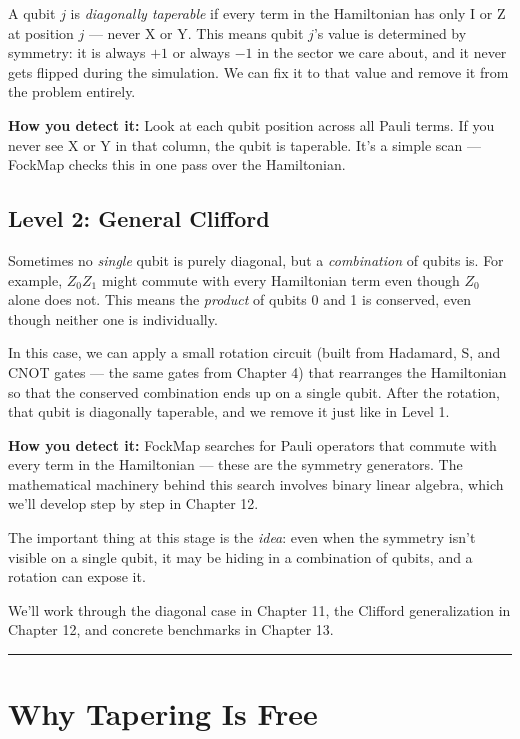\documentclass[
  11pt,
  oneside]{book}
\begin{document}
A qubit \(j\) is \emph{diagonally taperable} if every term in the
Hamiltonian has only I or Z at position \(j\) --- never X or Y. This
means qubit \(j\)'s value is determined by symmetry: it is always \(+1\)
or always \(-1\) in the sector we care about, and it never gets flipped
during the simulation. We can fix it to that value and remove it from
the problem entirely.

\textbf{How you detect it:} Look at each qubit position across all Pauli
terms. If you never see X or Y in that column, the qubit is taperable.
It's a simple scan --- FockMap checks this in one pass over the
Hamiltonian.

\subsection{Level 2: General Clifford}\label{level-2-general-clifford}

Sometimes no \emph{single} qubit is purely diagonal, but a
\emph{combination} of qubits is. For example, \(Z_0 Z_1\) might commute
with every Hamiltonian term even though \(Z_0\) alone does not. This
means the \emph{product} of qubits 0 and 1 is conserved, even though
neither one is individually.

In this case, we can apply a small rotation circuit (built from
Hadamard, S, and CNOT gates --- the same gates from Chapter 4) that
rearranges the Hamiltonian so that the conserved combination ends up on
a single qubit. After the rotation, that qubit is diagonally taperable,
and we remove it just like in Level 1.

\textbf{How you detect it:} FockMap searches for Pauli operators that
commute with every term in the Hamiltonian --- these are the symmetry
generators. The mathematical machinery behind this search involves
binary linear algebra, which we'll develop step by step in Chapter 12.

The important thing at this stage is the \emph{idea}: even when the
symmetry isn't visible on a single qubit, it may be hiding in a
combination of qubits, and a rotation can expose it.

We'll work through the diagonal case in Chapter 11, the Clifford
generalization in Chapter 12, and concrete benchmarks in Chapter 13.

\begin{center}\rule{0.5\linewidth}{0.5pt}\end{center}

\section{Why Tapering Is Free}\label{why-tapering-is-free}
\end{document}
